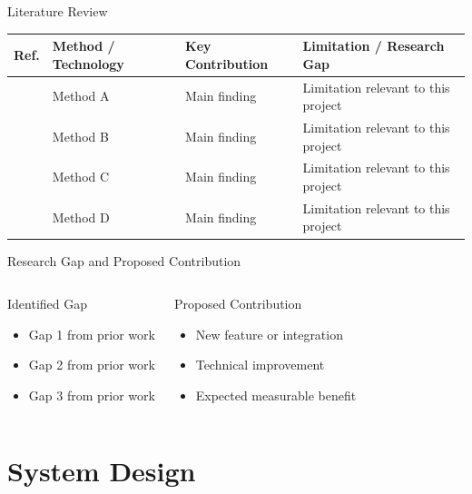 \documentclass[aspectratio=169,11pt]{beamer}
\begin{document}
\begin{frame}{Literature Review}
  \scriptsize
  \begin{tabularx}{\textwidth}{>{\raggedright\arraybackslash}p{0.8cm}
      >{\raggedright\arraybackslash}p{2.6cm}
      >{\raggedright\arraybackslash}p{2.5cm}
      >{\raggedright\arraybackslash}X}
    \toprule
    \textbf{Ref.} & \textbf{Method / Technology} & \textbf{Key Contribution} & \textbf{Limitation / Research Gap} \\
    \midrule
    {[1]} & Method A & Main finding & Limitation relevant to this project \\
    {[2]} & Method B & Main finding & Limitation relevant to this project \\
    {[3]} & Method C & Main finding & Limitation relevant to this project \\
    {[4]} & Method D & Main finding & Limitation relevant to this project \\
    \bottomrule
  \end{tabularx}
\end{frame}

\begin{frame}{Research Gap and Proposed Contribution}
  \begin{columns}[T,onlytextwidth]
      \begin{block}{Identified Gap}
        \begin{itemize}
          \item Gap 1 from prior work
          \item Gap 2 from prior work
          \item Gap 3 from prior work
        \end{itemize}
      \end{block}
      \begin{block}{Proposed Contribution}
        \begin{itemize}
          \item New feature or integration
          \item Technical improvement
          \item Expected measurable benefit
        \end{itemize}
      \end{block}
  \end{columns}
\end{frame}

\section{System Design}
\end{document}
